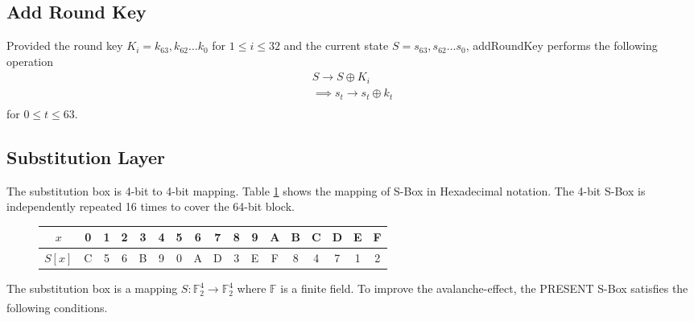 \documentclass[preprint]{transcrypto}
\begin{document}
\subsection{Add Round Key}
Provided the round key $K_i = k_{63},k_{62} \dots k_0$ for $1\leq i \leq 32$ and the current state $S = s_{63},s_{62}\dots s_0$, addRoundKey performs the following operation
\begin{eqnarray*}
    S \xrightarrow{} S \oplus K_i \\
    \implies s_t \xrightarrow[]{} s_t \oplus k_t 
\end{eqnarray*}
for $0\leq t\leq 63$.

\subsection{Substitution Layer}
The substitution box is 4-bit to 4-bit mapping. Table \ref{pSbox} shows the mapping of S-Box in Hexadecimal notation. The 4-bit S-Box is independently repeated 16 times to cover the 64-bit block.
\begin{figure}[h!]
    \centering
    \begin{tabular}{ |c||c|c|c|c|c|c|c|c|c|c|c|c|c|c|c|c| }
        \hline
        $x$ & 0 & 1 & 2 & 3&4& 5& 6&7&8&9&A&B&C&D&E&F  \\ \hline
        $S[x]$& C & 5 & 6& B &9 &0 &A &D& 3& E &F& 8& 4 &7& 1& 2 \\ \hline
    \end{tabular}
    \label{pSbox}
\end{figure}
The substitution box is a mapping $S:\mathbb{F}_2^4\xrightarrow[]{}\mathbb{F}_2^4$ where $\mathbb{F}$ is a finite field. To improve the avalanche-effect, the PRESENT S-Box satisfies the following conditions.
\end{document}
